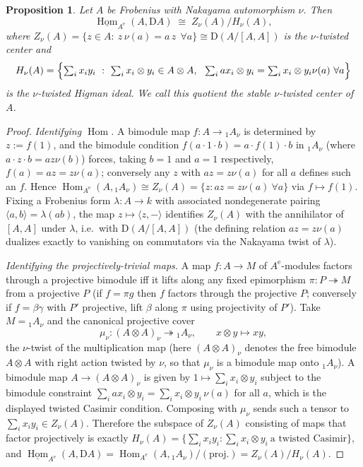 \documentclass[11pt]{amsart}
\newtheorem{proposition}[theorem]{Proposition}
\theoremstyle{definition}
\newcommand{\D}{\mathrm{D}}
\newcommand{\Hom}{\operatorname{Hom}}
\newcommand{\sHom}{\underline{\operatorname{Hom}}}
\newcommand{\Ae}{A^{\mathrm{e}}}
\newcommand{\kk}{k}
\begin{document}
\begin{proposition}\label{prop:stablecenter}
Let $A$ be Frobenius with Nakayama automorphism $\nu$. Then
\[
\sHom_{\Ae}(A,\D A)\;\cong\;Z_\nu(A)/H_\nu(A),
\]
where $Z_\nu(A)=\{z\in A:\ z\,\nu(a)=a\,z\ \ \forall a\}\cong\D(A/[A,A])$ is
the $\nu$-twisted center and
\[
H_\nu(A)=\Bigl\{\textstyle\sum_ix_iy_i\ :\ \sum_ix_i\otimes y_i\in A\otimes A,\
\ \sum_i ax_i\otimes y_i=\sum_ix_i\otimes y_i\nu(a)\ \forall a\Bigr\}
\]
is the \emph{$\nu$-twisted Higman ideal}. We call this quotient the
\emph{stable $\nu$-twisted center} of $A$.
\end{proposition}

\begin{proof}
\emph{Identifying $\Hom$.} A bimodule map $f\colon A\to{}_1A_\nu$ is determined
by $z:=f(1)$, and the bimodule condition $f(a\cdot1\cdot b)=a\cdot f(1)\cdot b$
in ${}_1A_\nu$ (where $a\cdot z\cdot b=az\nu(b)$) forces, taking $b=1$ and
$a=1$ respectively, $f(a)=az=z\nu(a)$; conversely any $z$ with $az=z\nu(a)$ for
all $a$ defines such an $f$. Hence $\Hom_{\Ae}(A,{}_1A_\nu)\cong Z_\nu(A)
=\{z:az=z\nu(a)\ \forall a\}$ via $f\mapsto f(1)$. Fixing a Frobenius form
$\lambda\colon A\to\kk$ with associated nondegenerate pairing
$\langle a,b\rangle=\lambda(ab)$, the map $z\mapsto\langle z,-\rangle$
identifies $Z_\nu(A)$ with the annihilator of $[A,A]$ under $\lambda$, i.e.\
with $\D(A/[A,A])$ (the defining relation $az=z\nu(a)$ dualizes exactly to
vanishing on commutators via the Nakayama twist of $\lambda$).

\emph{Identifying the projectively-trivial maps.} A map $f\colon A\to M$ of
$\Ae$-modules factors through a projective bimodule iff it lifts along any
fixed epimorphism $\pi\colon P\twoheadrightarrow M$ from a projective $P$ (if
$f=\pi g$ then $f$ factors through the projective $P$; conversely if
$f=\beta\gamma$ with $P'$ projective, lift $\beta$ along $\pi$ using
projectivity of $P'$). Take $M={}_1A_\nu$ and the canonical projective cover
\[
\mu_\nu\colon(A\otimes A)_\nu\twoheadrightarrow{}_1A_\nu,\qquad
x\otimes y\longmapsto xy,
\]
the $\nu$-twist of the multiplication map (here $(A\otimes A)_\nu$ denotes the
free bimodule $A\otimes A$ with right action twisted by $\nu$, so that $\mu_\nu$
is a bimodule map onto ${}_1A_\nu$). A bimodule map $A\to(A\otimes A)_\nu$ is
given by $1\mapsto\sum_i x_i\otimes y_i$ subject to the bimodule constraint
$\sum_i ax_i\otimes y_i=\sum_i x_i\otimes y_i\,\nu(a)$ for all $a$, which is the
displayed twisted Casimir condition. Composing with $\mu_\nu$ sends such a
tensor to $\sum_i x_iy_i\in Z_\nu(A)$. Therefore the subspace of $Z_\nu(A)$
consisting of maps that factor projectively is exactly
$H_\nu(A)=\{\sum_i x_iy_i:\sum_i x_i\otimes y_i\ \text{a twisted Casimir}\}$,
and $\sHom_{\Ae}(A,\D A)=\Hom_{\Ae}(A,{}_1A_\nu)/(\text{proj.})=Z_\nu(A)/H_\nu(A)$.
\end{proof}
\end{document}
